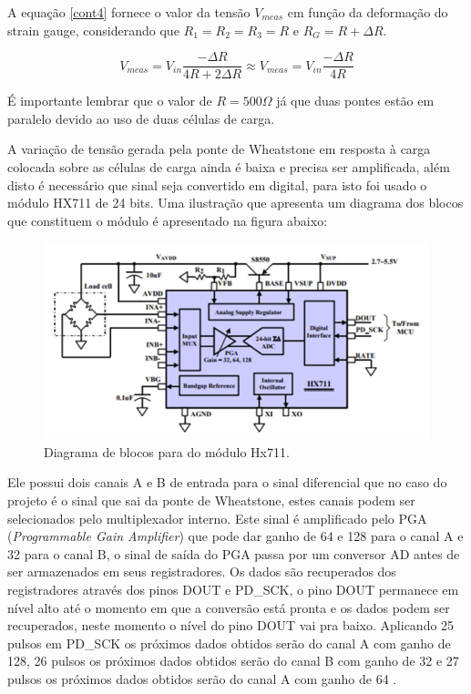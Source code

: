 A equação \ref{cont4} fornece o valor da tensão $V_{meas}$ em função da deformação do strain gauge, considerando que $R_{1}=R_{2}=R_{3}=R$ e $R_{G}=R+\Delta R$.

\begin{equation}
\label{cont4}
V_{meas}=V_{in} \frac{-\Delta R}{4R+2\Delta R} \approx V_{meas}=V_{in} \frac{-\Delta R}{4R}
\end{equation}

É importante lembrar que o valor de $R=500\Omega$ já que duas pontes estão em paralelo devido ao uso de duas células de carga.

A variação de tensão gerada pela ponte de Wheatstone em resposta à carga colocada sobre as células de carga ainda é baixa e precisa ser amplificada, além disto é necessário que  sinal seja convertido em digital, para isto foi usado o módulo HX711 de 24 bits. Uma ilustração que apresenta um diagrama dos blocos que constituem o módulo é apresentado na figura abaixo:

\begin{figure}[!h]
\centering \includegraphics[scale=0.7]{figuras/hx711}
\caption{Diagrama de blocos para do módulo Hx711.}
\label{hx711}
 \end{figure}

\pagebreak

Ele possui dois canais A e B de entrada para o sinal diferencial que no caso do projeto é o sinal que sai da ponte de Wheatstone, estes canais podem ser selecionados pelo multiplexador interno. Este sinal é amplificado pelo PGA (\textit{Programmable Gain Amplifier}) que pode dar ganho de 64 e 128 para o canal A e 32 para o canal B, o sinal de saída do PGA passa por um conversor AD antes de ser armazenados em seus registradores. Os dados são recuperados dos registradores através dos pinos DOUT e PD\_SCK, o pino DOUT permanece em nível alto até o momento em que a conversão está pronta e os dados podem ser recuperados, neste momento o nível do pino DOUT vai pra baixo. Aplicando 25 pulsos em PD\_SCK os próximos dados obtidos serão do canal A com ganho de 128, 26 pulsos os próximos dados obtidos serão do canal B com ganho de 32 e 27 pulsos os próximos dados obtidos serão do canal A com ganho de 64 \cite{avia:hx711}.

